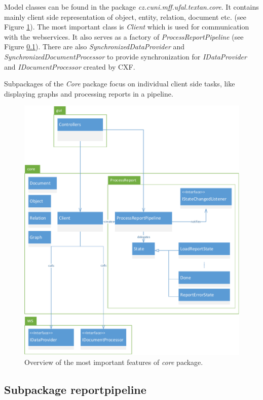Model classes can be found in the package \emph{cz.cuni.mff.ufal.textan.core}.
It contains mainly client side representation of object, entity, relation,
document etc. (see Figure \ref{fig:CorePackage}). The most important class is
\emph{Client} which is used for communication with the webservices. It also
serves as a factory of \emph{ProcessReportPipeline} (see Figure
\ref{sssec:ReportPipeline}). There are also \emph{SynchronizedDataProvider} and
\emph{SynchronizedDocumentProcessor} to provide synchronization for
\emph{IDataProvider} and \emph{IDocumentProcessor} created by CXF.

Subpackages of the \emph{Core} package focus on individual client side tasks,
like displaying graphs and processing reports in a pipeline.

\begin{figure}[!htb]
        \centering
        \includegraphics[width=\textwidth]{Images/CorePackage}
        \caption{Overview of the most important features of \emph{core} package.}
        \label{fig:CorePackage}
\end{figure}

\subsection{Subpackage reportpipeline}
\label{sssec:ReportPipeline}

